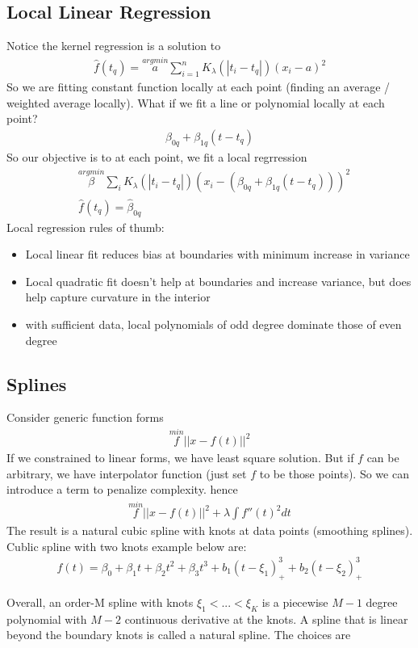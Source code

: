 \subsection{Local Linear Regression}
Notice the kernel regression is a solution to 
    \begin{align*}
        \hat{f}(t_q) = \overset{argmin}{a} \sum_{i=1}^n K_\lambda(|t_i - t_q|)(x_i-a)^2
    \end{align*}
So we are fitting constant function locally at each point (finding an average / weighted average locally). What if we fit a line or polynomial locally at each point? 
    \begin{align*}
        \beta_{0q} + \beta_{1q}(t-t_q) \tag{Centered at $t_q$}
    \end{align*}
So our objective is to at each point, we fit a local regrression
    \begin{align*}
        & \overset{argmin}{\beta} \sum_i K_\lambda(|t_i-t_q|)(x_i - (\beta_{0q} + \beta_{1q}(t-t_q)))^2\\
        & \hat{f}(t_q) = \hat{\beta}_{0q} \tag{Fit at $t_q$ is just intercept} 
    \end{align*}
Local regression rules of thumb: 
    \begin{itemize}
        \item Local linear fit reduces bias at boundaries with minimum increase in variance 
        \item Local quadratic fit doesn't help at boundaries and increase variance, but does help capture curvature in the interior 
        \item with sufficient data, local polynomials of odd degree dominate those of even degree 
    \end{itemize}
    

\subsection{Splines} 

Consider generic function forms
    \begin{align*}
        \overset{min}{f} ||x - f(t)||^2
    \end{align*}
If we constrained to linear forms, we have least square solution. But if $f$ can be arbitrary, we have interpolator function (just set $f$ to be those points). So we can introduce a term to penalize complexity. hence 
    \begin{align*}
        \overset{min}{f} || x-f(t)||^2 + \lambda \int f''(t)^2 dt
    \end{align*}
The result is a natural cubic spline with knots at data points (smoothing splines). \\
Cublic spline with two knots example below are: 
    \begin{align*}
        f(t) = \beta_0 + \beta_1 t + \beta_2 t^2 + \beta_3 t^3 + b_1(t-\xi_1)^3_+ + b_2(t-\xi_2)^3_+
    \end{align*}
 
Overall, an order-M spline with knots $\xi_1 < ... < \xi_K$ is a piecewise $M-1$ degree polynomial with $M-2$ continuous derivative at the knots. A spline that is linear beyond the boundary knots is called a natural spline. The choices are 